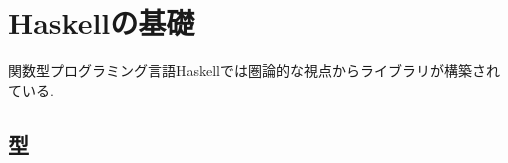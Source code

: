 \documentclass[dvipdfmx]{jsbook}
\theoremstyle{plain}
\newtheorem{Def}[thm]{定義}
\begin{document}
\begin{comment}
\begin{Def}
位相空間$X$と自然数$n$に対して次の手続きで決定されるアーベル群$H_n(X)$を{\bf$n$次 ホモロジー群}と呼ぶ

...

\end{Def}
\end{comment}
\begin{comment}
\section{環}
\begin{Def}
可換群$(G,+)$が次を満たすとき, {\bf $(G,+)$は加法群である}といい, {\bf $+$を加法}という.
\end{Def}
\begin{Def}
{\bf \times を乗法}という.
\end{Def}
\begin{Def}
{\bf 分配 distributive property}
\end{Def}


\section{体}
\begin{Def}
以下の条件を満たす集合を{\bf 体}という.
\begin{enumerate}
\item
加法について可換群になっている．すなわち,加法について閉じていて，単位元と逆元が存在する．
\item 
乗法について可換群になっている. すなわち,乗法について閉じていて，単位元と逆元が存在する.
\item 
加法と乗法について分配法則が成り立つ.
\end{enumerate}
\end{Def}
体ではいわゆる四則演算が可能である
\end{comment}

\chapter{Haskellの基礎}
関数型プログラミング言語Haskellでは圏論的な視点からライブラリが構築されている.
\section{型}
\end{document}
